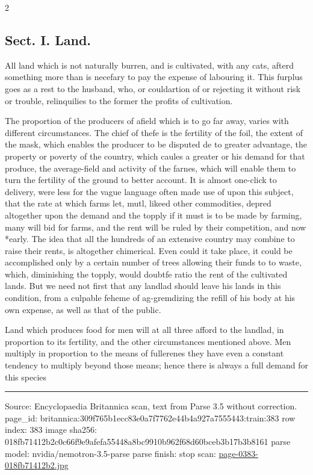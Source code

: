 \documentclass[10pt]{article}
\begin{document}
\begin{multicols}{2}
\subsection*{Sect. I. Land.}
All land which is not naturally burren, and is cultivated, with any cats, afterd something more than is necefary to pay the expense of labouring it. This furplus goes as a rest to the husband, who, or couldartion of or rejecting it without risk or trouble, relinquilies to the former the profits of cultivation.

The proportion of the producers of afield which is to go far away, varies with different circumstances. The chief of thefe is the fertility of the foil, the extent of the mask, which enables the producer to be disputed de to greater advantage, the property or poverty of the country, which caules a greater or his demand for that produce, the average-field and activity of the farnes, which will enable them to turn the fertility of the ground to better account. It is almost one-click to delivery, were less for the vague language often made use of upon this subject, that the rate at which farms let, mutl, likeed other commodities, depred altogether upon the demand and the topply if it must is to be made by farming, many will bid for farms, and the rent will be ruled by their competition, and now *early. The idea that all the hundreds of an extensive country may combine to raise their rents, is altogether chimerical. Even could it take place, it could be accomplished only by a certain number of trees allowing their funds to to waste, which, diminishing the topply, would doubtfe ratio the rent of the cultivated lands. But we need not first that any landlad should leave his lands in this condition, from a culpable feheme of ag-gremdizing the refill of his body at his own expense, as well as that of the public.

Land which produces food for men will at all three afford to the landlad, in proportion to its fertility, and the other circumstances mentioned above. Men multiply in proportion to the means of fullerenes they have even a constant tendency to multiply beyond those means; hence there is always a full demand for this species

\end{multicols}
\vfill\par\noindent\rule{\linewidth}{0.4pt}\par
{\scriptsize\color{gray}\noindent Source: Encyclopaedia Britannica scan, text from Parse 3.5 without correction. page\_id: britannica:309f765b1ecc83e0a7f7762e44b4a927a7555443:train:383 \quad row index: 383 \quad image sha256: 018fb71412b2c0c66f9e9afefa55448a8bc9910b962f68d60bceb3b17b3b8161 \quad parse model: nvidia/nemotron-3.5-parse \quad parse finish: stop \quad scan: \href{../scans/page-0383-018fb71412b2.jpg}{page-0383-018fb71412b2.jpg}\par}
\end{document}
